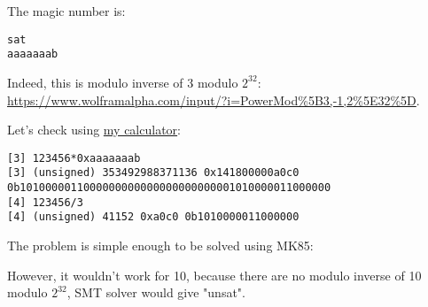 The magic number is:

\begin{lstlisting}
sat
aaaaaaab
\end{lstlisting}

Indeed, this is modulo inverse of 3 modulo $2^{32}$: \url{https://www.wolframalpha.com/input/?i=PowerMod%5B3,-1,2%5E32%5D}.

Let's check using \href{https://github.com/DennisYurichev/progcalc}{my calculator}:

\begin{lstlisting}
[3] 123456*0xaaaaaaab
[3] (unsigned) 353492988371136 0x141800000a0c0 0b1010000011000000000000000000000001010000011000000
[4] 123456/3
[4] (unsigned) 41152 0xa0c0 0b1010000011000000
\end{lstlisting}

The problem is simple enough to be solved using MK85:





However, it wouldn't work for 10, because there are no modulo inverse of 10 modulo $2^{32}$, SMT solver would give "unsat".

